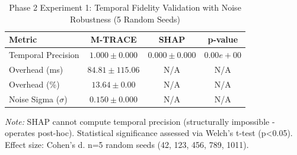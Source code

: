 
\begin{table}[h]
\centering
\caption{Phase 2 Experiment 1: Temporal Fidelity Validation with Noise Robustness (5 Random Seeds)}
\label{tab:experiment1_temporal_fidelity}
\begin{tabular}{lccc}
\toprule
\textbf{Metric} & \textbf{M-TRACE} & \textbf{SHAP} & \textbf{p-value} \\
\midrule
Temporal Precision & $1.000 \pm 0.000$ & $0.000 \pm 0.000$ & $0.00e+00$ \\
\midrule
Overhead (ms) & $84.81 \pm 115.06$ & N/A & N/A \\
\midrule
Overhead (\%) & $13.64 \pm 0.00$ & N/A & N/A \\
\midrule
Noise Sigma ($\sigma$) & $0.150 \pm 0.000$ & N/A & N/A \\
\bottomrule
\end{tabular}
\begin{flushleft}
\small
\textit{Note:} SHAP cannot compute temporal precision (structurally impossible - operates post-hoc).
Statistical significance assessed via Welch's t-test (p<0.05). Effect size: Cohen's d.
n=5 random seeds (42, 123, 456, 789, 1011).
\end{flushleft}
\end{table}
